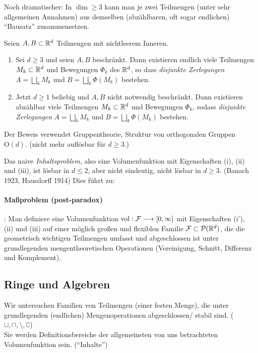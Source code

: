 Noch dramatischer: In $\dim \geq 3$ kann man je zwei Teilmengen (unter sehr allgemeinen Annahmen) aus demselben (abzählbaren, oft sogar endlichen) ``Bausatz'' zusammensetzen.
\begin{satz} Seien $A,B\subset \mathbb{R}^d$ Teilmengen mit nichtleerem Inneren.
\begin{enumerate}[(\roman*)]
\item Sei $d \geq 3$ und seien $A,B$ beschränkt. Dann existieren endlich viele Teilmengen $M_k \subset \mathbb{R}^d$ und Bewegungen $\Phi_k$ des $\mathbb{R}^d$, so dass \emph{disjunkte Zerlegungen} $A=\bigsqcup_k M_k$ und $B = \bigsqcup_k \Phi(M_k)$ bestehen.
\item Jetzt $d\geq 1$ beliebig und $A,B$ nicht notwendig beschränkt. Dann existieren abzählbar viele Teilmengen $M_k \subset \mathbb{R}^d$ und Bewegungen $\Phi_k$, sodass  \emph{disjunkte Zerlegungen} $A=\bigsqcup_k M_k$ und $B = \bigsqcup_k \Phi(M_k)$ bestehen.
\end{enumerate}
Der Beweis verwendet Gruppentheorie, Struktur von orthogonalen Gruppen $\mathrm{O}(d)$. (nicht mehr auflösbar für $d\geq 3$.)
\end{satz}
Das naive \emph{Inhaltsproblem}, also eine Volumenfunktion mit Eigenschaften (i), (ii) und (iii), ist lösbar in $d\leq 2$, aber nicht eindeutig, nicht lösbar in $d\geq 3$. (Banach 1923, Hausdorff 1914) Dies führt zu:
\vspace{-10pt}
\paragraph{Maßproblem (post-paradox)}: Man definiere eine Volumenfunktion $\operatorname{vol}: \mathcal{F} \longrightarrow [0,\infty]$ mit Eigenschaften (i'), (ii) und (iii) auf einer möglich großen und flexiblen Familie $\mathcal{F} \subset \mathcal{P}(\mathbb{R}^d)$, die die geometrisch wichtigen Teilmengen umfasst und abgeschlossen ist unter grundlegenden mengentheoretischen Operationen (Vereinigung, Schnitt, Differenz und Komplement). 
\subsection{Ringe und Algebren}
Wir untersuchen Familien von Teilmengen (einer festen Menge), die unter grundlegenden (endlichen) Mengenoperationen abgeschlossen/ stabil sind. ($\cup,\cap,\setminus,\complement$) \\
Sie werden Definitionsbereiche der allgemeinsten von uns betrachteten Volumenfunktion sein. (``Inhalte'')

